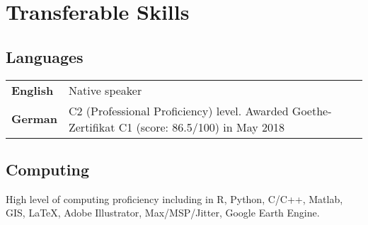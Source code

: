 \section*{Transferable Skills}

\subsection*{Languages}

\begin{center}
\begin{tabular}{ l l }
\textbf{English}  & Native speaker\\ 
\textbf{German} & C2 (Professional Proficiency) level. Awarded Goethe-Zertifikat C1 (score: 86.5/100) in May 2018\\ 
\end{tabular}
\end{center}

\subsection*{Computing}

\noindent High level of computing proficiency including in R, Python, C/C++, Matlab, GIS, \LaTeX, Adobe Illustrator, Max/MSP/Jitter, Google Earth Engine.



